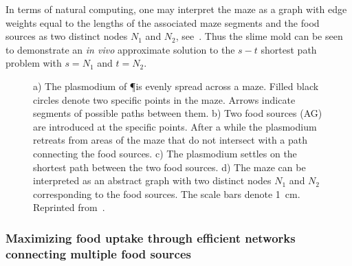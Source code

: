 			In terms of natural computing, one may interpret the maze as a graph with edge weights equal to the lengths of the associated maze segments and the food sources as two distinct nodes $N_1$ and $N_2$, see~. Thus the slime mold \Pp can be seen to demonstrate an \emph{in vivo} approximate solution to the $s-t$ shortest path problem with $s=N_1$ and $t=N_2$. 

			\begin{figure}
				\centering
				\newline
				
				\caption[Classic maze experiment with \P]{ a) The plasmodium of 
				\P is evenly spread across a maze. Filled black circles denote two specific points in the maze. Arrows indicate segments of possible paths between them. b) Two food sources (AG) are introduced at the specific points. After a while the plasmodium retreats from areas of the maze that do not intersect with a path connecting the food sources. c) The plasmodium settles on the shortest path between the two food sources. d) The maze can be interpreted as an abstract graph with two distinct nodes $N_1$ and $N_2$ corresponding to the food sources. The scale bars denote \SI{1}{\centi\metre}. Reprinted from~\cite{Tero2007553}.}
				\label{fig:maze}
			\end{figure}

			\FloatBarrier

		\subsubsection{Maximizing food uptake through efficient networks connecting multiple food sources}

